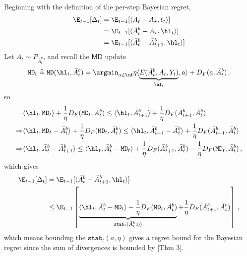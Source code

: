Beginning with the definition of the per-step Bayesian regret,
\begin{align*}
    \E_{t-1}[\Delta_t]
     & =\E_{t-1}[\langle A_t - A_\star, \ell_t \rangle]                 \\
     & =\E_{t-1}[\langle \bar{A}^b_t - A_\star, \hl_t \rangle]          \\
     & = \E_{t-1}[\langle \bar{A}^b_t - \bar{A}^b_{t+1}, \hl_t \rangle]
\end{align*}
Let $A_t \sim P_{\bar{A}^b_t}$, and recall the $\textsf{MD}$ update
\begin{align*}
    \texttt{MD}_t \triangleq \texttt{MD}(\hl_t, \bar{A}^b_t) = \argmin_{a \in \cA} \eta \langle \underbrace{E(\bar{A}^b_t, A_t, Y_t)}_{\hl_t}, a \rangle + D_F(a, \bar{A}^b_t)\,,
\end{align*}
so
\begin{align*}
     & \langle \hl_t, \texttt{MD}_t \rangle + \frac{1}{\eta} D_F(\texttt{MD}_t, \bar{A}_t^b)
    \leq
    \langle \hl_t, \bar{A}^b_{t+1} \rangle + \frac{1}{\eta}D_F(\bar{A}^b_{t+1}, \bar{A}_t^b)                 \\
    \Rightarrow
     & \langle \hl_t, \texttt{MD}_t - \bar{A}_{t}^b \rangle + \frac{1}{\eta} D_F(\texttt{MD}_t, \bar{A}_t^b)
    \leq
    \langle \hl_t, \bar{A}^b_{t+1} - \bar{A}_{t}^b \rangle + \frac{1}{\eta}D_F(\bar{A}^b_{t+1}, \bar{A}_t^b) \\
    \Rightarrow
     & \langle \hl_t, \bar{A}_{t}^b - \bar{A}^b_{t+1} \rangle
    \leq
    \langle \hl_t, \bar{A}_{t}^b - \texttt{MD}_t \rangle
    +
    \frac{1}{\eta}D_F(\bar{A}^b_{t+1}, \bar{A}_t^b)
    - \frac{1}{\eta} D_F(\texttt{MD}_t, \bar{A}_t^b)\,,
\end{align*}
which gives
\begin{align*}
    \E_{t-1}[\Delta_t]
     & = \E_{t-1}[\langle \bar{A}^b_t - \bar{A}^b_{t+1}, \hl_t \rangle] \\
     & \leq \E_{t-1}\left[
    \underbrace{
        \langle \hl_t, \bar{A}_{t}^b - \texttt{MD}_t \rangle
        - \frac{1}{\eta} D_F(\texttt{MD}_t, \bar{A}_t^b)}_{
        \texttt{stab}_t(\bar{A}_t^b; \eta)
    }
    +\frac{1}{\eta}D_F(\bar{A}^b_{t+1}, \bar{A}_t^b)
    \right]                                          \,,                \\
\end{align*}
which means bounding the $\texttt{stab}_t(a, \eta)$ gives a regret bound for the Bayesian regret
since the sum of divergences is bounded by \citet{lattimore2019information}[Thm 3].

